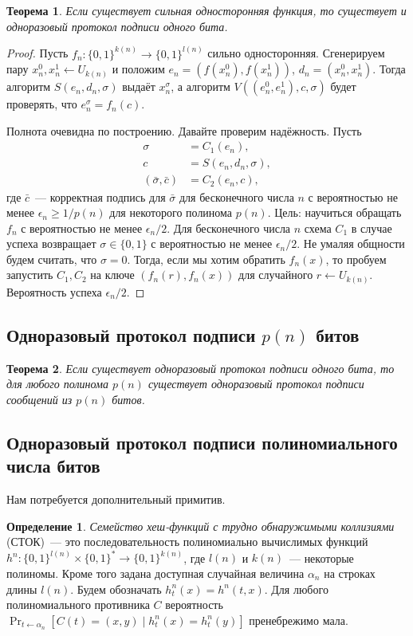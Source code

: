 \documentclass[12pt,a4paper]{article}
\newcommand{\bits}{\{0,1\}}
\theoremstyle{definition}
\newtheorem{definition}{Определение}[section]
\theoremstyle{plain}
\newtheorem{theorem}{Теорема}[section]
\theoremstyle{remark}
\begin{document}
\begin{theorem}
Если существует сильная односторонняя функция, то существует
и одноразовый протокол подписи одного бита.
\end{theorem}
\begin{proof}
Пусть $f_n:\bits^{k(n)}\to\bits^{l(n)}$ сильно односторонняя.
Сгенерируем пару $x^0_n,x^1_n\gets U_{k(n)}$ и положим $e_n = (f(x^0_n), f(x^1_n))$, $d_n=(x^0_n,x^1_n)$. Тогда алгоритм $S(e_n,d_n, \sigma)$ выдаёт $x^\sigma_n$, а
алгоритм $V((e^0_n, e^1_n), c, \sigma)$ будет проверять, 
что $e^\sigma_n = f_n(c)$.

Полнота очевидна по построению. Давайте проверим надёжность.
Пусть 
$$
\begin{aligned}
\sigma &= C_1(e_n),\\
c &= S(e_n, d_n, \sigma),\\
(\bar \sigma, \bar c) &= C_2(e_n,c),
\end{aligned}
$$
где $\bar c$~--- корректная подпись для 
$\bar\sigma$ для бесконечного числа $n$ с вероятностью
не менее $\epsilon_n\ge 1/p(n)$ для некоторого полинома $p(n)$. Цель: научиться обращать $f_n$ с вероятностью
не менее $\epsilon_n/2$. Для бесконечного числа $n$ схема
$C_1$ в случае успеха возвращает $\sigma\in\bits$ с вероятностью
не менее $\epsilon_n/2$. Не умаляя общности будем считать,
что $\sigma = 0$. Тогда, если мы хотим обратить $f_n(x)$,
то пробуем запустить $C_1,C_2$ на ключе $(f_n(r),f_n(x))$ 
для случайного $r\gets U_{k(n)}$. Вероятность успеха $\epsilon_n/2$.
\end{proof}

\subsection{Одноразовый протокол подписи $p(n)$ битов}
\begin{theorem}
Если существует одноразовый протокол подписи одного бита,
то для любого полинома $p(n)$ существует одноразовый протокол подписи сообщений из $p(n)$ битов.
\end{theorem}

\subsection{Одноразовый протокол подписи полиномиального числа битов}
Нам потребуется дополнительный примитив.
\begin{definition}
\emph{Семейство хеш-функций с трудно обнаружимыми коллизиями}\break
(СТОК)~--- это последовательность полиномиально вычислимых функций $h^n:\bits^{l(n)}\times \bits^{*}\to\bits^{k(n)}$, где $l(n)$ и $k(n)$~--- некоторые полиномы. Кроме того задана
доступная случайная величина $\alpha_n$ на строках длины $l(n)$.
Будем обозначать $h^n_t(x) = h^n(t,x)$.  Для любого 
полиномиального противника $C$ вероятность
$\Pr_{t\gets\alpha_n}[C(t) = (x, y)\mid h^n_t(x) = h^n_t(y)]$
пренебрежимо мала.
\end{definition}
\end{document}
